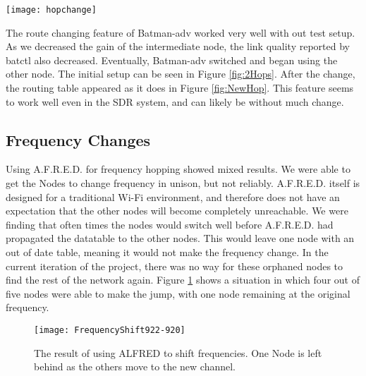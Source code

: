 \begin{figure*}
	\centering
	\texttt{[image: hopchange]}
	\caption{After the gain is reduced, the packets are now routing through a different node.}
	\label{fig:NewHop}
\end{figure*}

The route changing feature of Batman-adv worked very well with out test setup. As we decreased the gain of the intermediate node, the link quality reported by batctl also decreased. Eventually, Batman-adv switched and began using the other node. The initial setup can be seen in Figure \ref{fig:2Hops}. After the change, the routing table appeared as it does in Figure \ref{fig:NewHop}. This feature seems to work well even in the SDR system, and can likely be without much change.  

\subsection{Frequency Changes}

Using A.F.R.E.D. for frequency hopping showed mixed results. We were able to get the Nodes to change frequency in unison, but not reliably. A.F.R.E.D. itself is designed for a traditional Wi-Fi environment, and therefore does not have an expectation that the other nodes will become completely unreachable. We were finding that often times the nodes would switch well before A.F.R.E.D. had propagated the datatable to the other nodes. This would leave one node with an out of date table, meaning it would not make the frequency change. In the current iteration of the project, there was no way for these orphaned nodes to find the rest of the network again. Figure \ref{fig:freqshift} shows a situation in which four out of five nodes were able to make the jump, with one node remaining at the original frequency.

\begin{figure}
	\centering
	\texttt{[image: FrequencyShift922-920]}
	\caption{The result of using ALFRED to shift frequencies. One Node is left behind as the others move to the new channel.}
	\label{fig:freqshift}
\end{figure}


